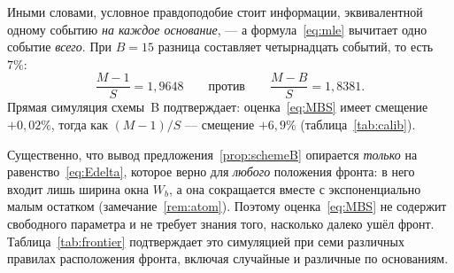 \documentclass[11pt,a4paper]{article}
\theoremstyle{plain}
\theoremstyle{remark}
\begin{document}
Иными словами, условное правдоподобие стоит информации, эквивалентной одному событию
\emph{на каждое основание}, --- а формула~\eqref{eq:mle} вычитает одно событие
\emph{всего}. При $B=15$ разница составляет четырнадцать событий, то есть $7\%$:
\begin{equation}
\frac{M-1}{S}=1{,}9648\qquad\text{против}\qquad\frac{M-B}{S}=1{,}8381 .
\end{equation}
Прямая симуляция схемы~B подтверждает: оценка~\eqref{eq:MBS} имеет смещение $+0{,}02\%$,
тогда как $(M-1)/S$ --- смещение $+6{,}9\%$ (таблица~\ref{tab:calib}).

Существенно, что вывод предложения~\ref{prop:schemeB} опирается \emph{только} на
равенство~\eqref{eq:Edelta}, которое верно для \emph{любого} положения фронта:
в него входит лишь ширина окна $W_b$, а она сокращается вместе с
экспоненциально малым остатком (замечание~\ref{rem:atom}). Поэтому
оценка~\eqref{eq:MBS} не содержит свободного параметра и не требует знания того,
насколько далеко ушёл фронт. Таблица~\ref{tab:frontier} подтверждает это симуляцией
при семи различных правилах расположения фронта, включая случайные и различные по
основаниям.
\end{document}
